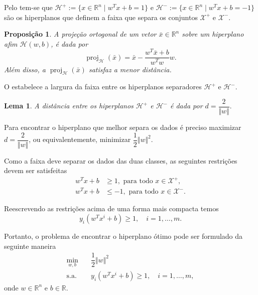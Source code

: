 \documentclass{beamer}
\DeclareMathOperator{\proj}{proj}
\def\Xset{\mathcal{X}}
\def\Hset{\mathcal{H}}
\def\RR{\mathds{R}}
\def\xbar{\bar{x}}
\newtheorem{prop}{Proposição}
\newtheorem{lema}{Lema}
\theoremstyle{definition}%
\begin{document}
\begin{frame}
Pelo  tem-se que $\Hset^{+}:=\{x\in \RR^n \mid w^{T}x+b= 1\}$ e $\Hset^{-}:=\{x\in \RR^n \mid w^{T}x+b= -1\}$ são os hiperplanos que definem a faixa que separa os conjuntos $\Xset^{+}$ e $\Xset^{-}$.

\begin{prop} \label{prop1} A projeção ortogonal de um vetor $\xbar\in \RR^n$ sobre um hiperplano afim $\Hset(w,b)$, é dada por
	\[ \proj_{\Hset}(\xbar)= \xbar - \dfrac{w^{T}\xbar+b}{w^{T}w}w. \]
	Além disso, a $\proj_{\Hset}(\xbar)$ satisfaz a menor distância.
\end{prop}
\end{frame}


\begin{frame}
O  estabelece a largura da faixa entre os hiperplanos separadores $\Hset^{+}$ e $\Hset^{-}$.

\begin{lema}\label{lema2} A distância entre os hiperplanos $\Hset^{+}$ e $\Hset^{-}$ é dada por $d=\dfrac{2}{\Vert w\Vert}.$
\end{lema}
\end{frame}


\begin{frame}
Para encontrar o hiperplano que melhor separa os dados é preciso maximizar $d=\dfrac{2}{\Vert w\Vert }$, ou equivalentemente, minimizar $\dfrac{1}{2}\Vert w\Vert^{2}$. 

Como a faixa deve separar os dados das duas classes, as seguintes restrições devem ser satisfeitas
\begin{align}
w^{T}x+b &\geq 1 , \text{ para  todo } x\in \Xset^{+}, \\
w^{T}x+b &\leq -1 , \text{ para  todo } x\in \Xset^{-}.
\end{align}

Reescrevendo as restrições acima de uma forma mais compacta temos
\[ y_{i}(w^{T}x^{i}+b)\geq 1, \quad i=1, \ldots ,m. \]
\end{frame}


\begin{frame}
Portanto, o problema de encontrar o hiperplano ótimo pode ser formulado da seguinte maneira
\[ \label{eq5}
\begin{aligned}
\min_{w,b} & \quad \dfrac{1}{2} \Vert w\Vert^{2} \\
\text{s.a.} &  \quad y_i(w^{T}x^{i}+b) \geq 1, \quad i=1, \ldots , m, \end{aligned}
\]
onde $w\in \RR^{n}$ e $b\in \RR$. 
\end{frame}
\end{document}
